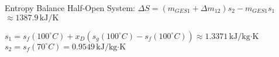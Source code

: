 Entropy Balance Half-Open System:  
\( \Delta S = (m_{GES1} + \Delta m_{12}) s_2 - m_{GES1} s_1 \)  
\( \approx 1387.9 \, \text{kJ/K} \)  

\( s_1 = s_f(100^\circ C) + x_D(s_g(100^\circ C) - s_f(100^\circ C)) \approx 1.3371 \, \text{kJ/kg·K} \)  
\( s_2 = s_f(70^\circ C) = 0.9549 \, \text{kJ/kg·K} \)